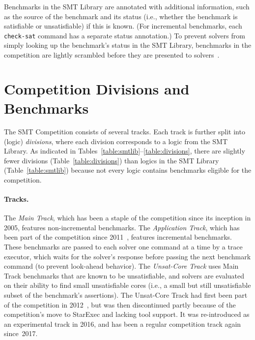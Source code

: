 \documentclass[dvipsnames,table,twoside,11pt]{article}
\newcommand{\maintrack}{Main Track\xspace}
\newcommand{\apptrack}{Application Track\xspace}
\newcommand{\ucoretrack}{Unsat-Core Track\xspace}
\begin{document}
Benchmarks in the SMT Library are annotated with additional
information, such as the source of the benchmark and its status (i.e.,
whether the benchmark is satisfiable or unsatisfiable) if this is
known.  (For incremental benchmarks, each {\tt check-sat} command has
a separate status annotation.)  To prevent solvers from simply looking
up the benchmark's status in the SMT Library, benchmarks in the
competition are lightly scrambled before they are presented to
solvers~\cite{DBLP:conf/cade/Weber16}.


\section{Competition Divisions and Benchmarks}
\label{sec:benchmarks}

The SMT Competition consists of several tracks.  Each track is further split
into (logic) \emph{divisions}, where each division corresponds to a logic from
the SMT Library.  As indicated in
Tables~\ref{table:smtlib}--\ref{table:divisions}, there are slightly fewer
divisions (Table~\ref{table:divisions}) than logics in the SMT Library
(Table~\ref{table:smtlib}) because not every logic contains benchmarks eligible
for the competition.

\paragraph{Tracks.}
The \emph{\maintrack}, which
has been a staple of the competition since its
inception in 2005, features non-incremental benchmarks.  The
\emph{\apptrack}, which has been part of the competition since
2011~\cite{BDdMOS13}, features incremental benchmarks.  These
benchmarks are passed to each solver one command at a time by a trace
executor, which waits for the solver's response before passing the
next benchmark command (to prevent look-ahead behavior).  The
\emph{\ucoretrack} uses \maintrack benchmarks that are known to
be unsatisfiable, and solvers are evaluated on their ability to find
small unsatisfiable cores (i.e., a small but still unsatisfiable
subset of the benchmark's assertions).  The \ucoretrack had first
been part of the competition in 2012~\cite{CGBD12}, but was then
discontinued partly because of the competition's move to StarExec and
lacking tool support.  It was re-introduced as an experimental track
in 2016, and has been a regular competition track again since~2017.
\end{document}
